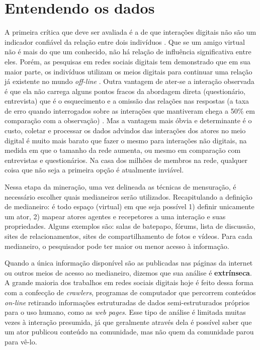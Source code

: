 \chapter{Entendendo os dados}
\label{ch:dados}

A primeira crítica que deve ser avaliada é a de que interações digitais não são
um indicador confiável da relação entre dois indivíduos \citep{Clemons2007}. Que
se um amigo virtual não é mais do que um conhecido, não há relação de influência
significativa entre eles. Porém, as pesquisas em redes sociais digitais tem
demonstrado que em sua maior parte, os indivíduos utilizam os meios digitais para
continuar uma relação já existente no mundo \emph{off-line}
\citep{Haythornthwaite2005, Recuero2008, Sassen2002}. Outra vantagem
de ater-se a interação observada é que ela não carrega alguns pontos fracos da
abordagem direta (questionário, entrevista) que é o esquecimento e a omissão das
relações nas respostas (a taxa de erro quando interrogados sobre as interações
que mantiveram chega a 50\% em comparação com a observação) \citep{Mislove2007}.
Mas a vantagem mais óbvia e determinante é o custo, coletar e processar os dados
advindos das interações dos atores no meio digital é muito mais barato que fazer
o mesmo para interações não digitais, na medida em que o tamanho da rede aumenta,
ou mesmo em comparação com entrevistas e questionários. Na casa dos milhões de
membros na rede, qualquer coisa que não seja a primeira opção é atualmente
inviável.

Nessa etapa da mineração, uma vez delineada as técnicas de mensuração, é
necessário escolher quais medianeiros serão utilizados. Recapitulando a definição
de medianeiro: é todo espaço (virtual) em que seja possível 1) definir unicamente
um ator, 2) mapear atores agentes e recepetores a uma interação e suas
propriedades. Alguns exemplos são: salas de batepapo, fórums, lista de discussão,
sites de relacionamentos, sites de compartilhamento de fotos e vídeos. Para cada
medianeiro, o pesquisador pode ter maior ou menor acesso à informação.

Quando a única informação disponível são as publicadas nas páginas da internet
ou outros meios de acesso ao medianeiro, dizemos que sua análise é
\textbf{extrínseca}. A grande maioria dos trabalhos em redes sociais digitais
hoje é feito dessa forma com a confecção de \emph{crawlers}, programas de
computador que percorrem conteúdos \emph{on-line} retirando informações
estruturadas de dados semi-estruturados próprios para o uso humano, como as
\emph{web pages}. Esse tipo de análise é limitada muitas vezes à interação
presumida, já que geralmente através dela é possível saber que um ator publicou
conteúdo na comunidade, mas não quem da comunidade parou para vê-lo.

